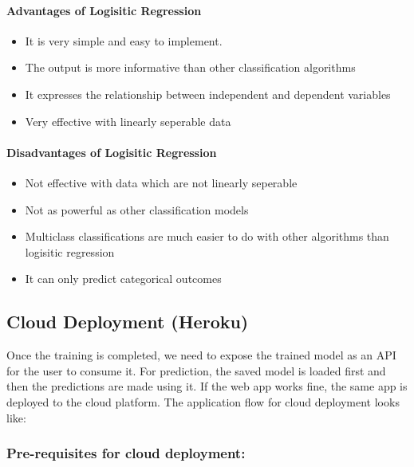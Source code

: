 \documentclass[11pt]{article}
\providecommand{\tightlist}{%
      \setlength{\itemsep}{0pt}\setlength{\parskip}{0pt}}
\begin{document}
    \paragraph{Advantages of Logisitic
Regression}\label{advantages-of-logisitic-regression}

\begin{itemize}
\tightlist
\item
  It is very simple and easy to implement.
\item
  The output is more informative than other classification algorithms
\item
  It expresses the relationship between independent and dependent
  variables
\item
  Very effective with linearly seperable data
\end{itemize}

\paragraph{Disadvantages of Logisitic
Regression}\label{disadvantages-of-logisitic-regression}

\begin{itemize}
\tightlist
\item
  Not effective with data which are not linearly seperable
\item
  Not as powerful as other classification models
\item
  Multiclass classifications are much easier to do with other algorithms
  than logisitic regression
\item
  It can only predict categorical outcomes
\end{itemize}

    \subsection{Cloud Deployment (Heroku)}\label{cloud-deployment-heroku}

Once the training is completed, we need to expose the trained model as
an API for the user to consume it. For prediction, the saved model is
loaded first and then the predictions are made using it. If the web app
works fine, the same app is deployed to the cloud platform. The
application flow for cloud deployment looks like:

    \subsubsection{Pre-requisites for cloud
deployment:}\label{pre-requisites-for-cloud-deployment}
\end{document}
